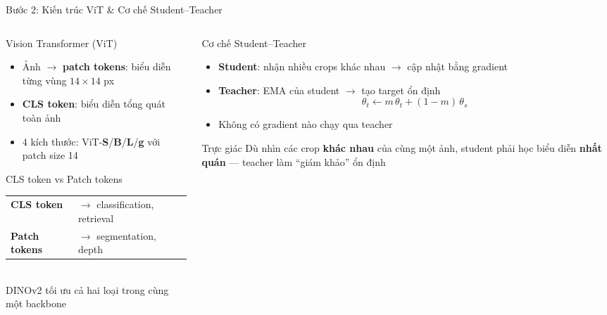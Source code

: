 \documentclass[aspectratio=169]{beamer}
\begin{document}
\begin{frame}[t,shrink=15]{Bước 2: Kiến trúc ViT \& Cơ chế Student--Teacher}
    \begin{columns}[t]
        \begin{column}{0.48\textwidth}
            \begin{block}{Vision Transformer (ViT)}
                \begin{itemize}
                    \item Ảnh $\to$ \textbf{patch tokens}: biểu diễn từng vùng $14\times14$ px
                    \item \textbf{CLS token}: biểu diễn tổng quát toàn ảnh
                    \item 4 kích thước: ViT-\textbf{S}/\textbf{B}/\textbf{L}/\textbf{g} với patch size 14
                \end{itemize}
            \end{block}
            \vspace{0.2cm}
            \begin{block}{CLS token vs Patch tokens}
                \small
                \begin{tabular}{ll}
                    \textbf{CLS token} & $\to$ classification, retrieval \\
                    \textbf{Patch tokens} & $\to$ segmentation, depth \\
                \end{tabular}\\[0.15cm]
                DINOv2 tối ưu \alert{cả hai loại} trong cùng một backbone
            \end{block}
        \end{column}
        \begin{column}{0.48\textwidth}
            \begin{block}{Cơ chế Student--Teacher}
                \begin{itemize}
                    \item \textbf{Student}: nhận nhiều crops khác nhau $\to$ cập nhật bằng gradient
                    \item \textbf{Teacher}: EMA của student $\to$ tạo target ổn định
                    \[\theta_t \leftarrow m\,\theta_t + (1-m)\,\theta_s\]
                    \item Không có gradient nào chạy qua teacher
                \end{itemize}
            \end{block}
            \vspace{0.2cm}
            \begin{exampleblock}{Trực giác}
                Dù nhìn các crop \textbf{khác nhau} của cùng một ảnh, student phải học biểu diễn \textbf{nhất quán} --- teacher làm ``giám khảo'' ổn định
            \end{exampleblock}
        \end{column}
    \end{columns}
\end{frame}
\end{document}
